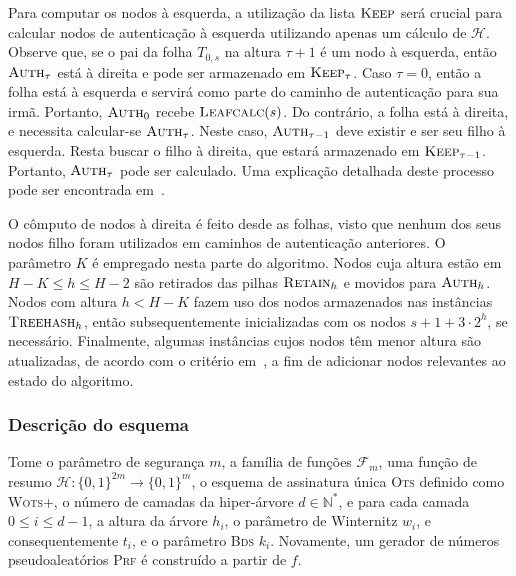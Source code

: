 \documentclass{ufsctex/ufsctex}
\newcommand{\hh}{\mathcal{H}}
\newcommand{\binwds}[1]{\{0, 1\}^{#1}}
\newcommand{\bds}{\textsc{Bds}}
\newcommand{\wotsplus}{\textsc{Wots+}}
\begin{document}
Para computar os nodos à esquerda, a utilização da lista $\textsc{Keep}$ será
crucial para calcular nodos de autenticação à esquerda utilizando apenas um
cálculo de $\hh{}$. Observe que, se o pai da folha $T_{0, s}$ na altura $\tau +
1$ é um nodo à esquerda, então $\textsc{Auth}_{\tau}$ está à direita e pode ser
armazenado em $\textsc{Keep}_{\tau}$. Caso $\tau = 0$, então a folha está à
esquerda e servirá como parte do caminho de autenticação para sua irmã.
Portanto, $\textsc{Auth}_{0}$ recebe $\textsc{Leafcalc}(s)$. Do contrário, a
folha está à direita, e necessita calcular-se $\textsc{Auth}_{\tau}$. Neste
caso, $\textsc{Auth}_{\tau - 1}$ deve existir e ser seu filho à esquerda. Resta
buscar o filho à direita, que estará armazenado em $\textsc{Keep}_{\tau - 1}$.
Portanto, $\textsc{Auth}_{\tau}$ pode ser calculado. Uma explicação detalhada
deste processo pode ser encontrada
em~\cite[2.1]{Buchmann:2008:MTT:1473109.1473114}.

O cômputo de nodos à direita é feito desde as folhas, visto que nenhum dos seus
nodos filho foram utilizados em caminhos de autenticação anteriores. O
parâmetro $K$ é empregado nesta parte do algoritmo. Nodos cuja altura estão em
$H - K \leq h \leq H - 2$ são retirados das pilhas $\textsc{Retain}_{h}$ e
movidos para $\textsc{Auth}_h$. Nodos com altura $h < H - K$ fazem uso dos
nodos armazenados nas instâncias $\textsc{Treehash}_{h}$, então
subsequentemente inicializadas com os nodos $s + 1 + 3 \cdot 2^h$, se
necessário. Finalmente, algumas instâncias cujos nodos têm menor altura são
atualizadas, de acordo com o critério
em~\cite[4.5]{Bernstein:2008:PQC:1522375}, a fim de adicionar nodos relevantes
ao estado do algoritmo.

\subsubsection{Descrição do esquema}

Tome o parâmetro de segurança $m$, a família de funções $\mathcal{F}_m$, uma
função de resumo $\hh{} : \binwds{2m} \longrightarrow \binwds{m}$, o esquema de
assinatura única \textsc{Ots} definido como \wotsplus{}, o número de camadas da
hiper-árvore $d \in \mathbb{N}^{*}$, e para cada camada $0 \leq i \leq d - 1$,
a altura da árvore $h_i$, o parâmetro de Winternitz $w_i$, e consequentemente
$t_i$, e o parâmetro \bds{} $k_i$. Novamente, um gerador de números
pseudoaleatórios \textsc{Prf} é construído a partir de $f$.
\end{document}
